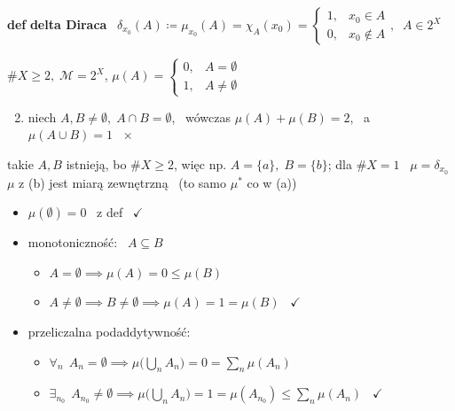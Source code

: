 \documentclass[a4paper,12pt]{article}
\begin{document}
\begin{podpunkty}
    \smallskip
    \textbf{def} \; \textbf{delta Diraca} \, \(\delta_{x_0}(A) \coloneqq \mu_{x_0}(A) = \chi_A(x_0) = \begin{cases} 1, & x_0 \in A \\ 0, & x_0 \notin A \end{cases}, \;\; A \in 2^X\)
    \item \(\#X \geq 2, \; \mathcal{M} = 2^X\), \; \(\mu(A) = \begin{cases} 0, & A = \emptyset \\ 1, & A \neq \emptyset \end{cases}\)
    \begin{enumerate}[label=\roman*), leftmargin=1.9em, itemsep=0.2em, topsep=0.2em, parsep=0pt, partopsep=0pt]
        \setcounter{enumi}{1}
        \item niech \(A, B \neq \emptyset, \; A \cap B = \emptyset\), \, wówczas \(\mu(A) + \mu(B) = 2\), \, a \(\mu(A \cup B) = 1\) \, \(\times\)
    \end{enumerate}
    takie \(A, B\) istnieją, bo \(\#X \geq 2\), więc np. \(A = \{a\}, \; B = \{b\}\); \; dla \(\#X = 1\) \, \(\mu = \delta_{x_0}\)
    \itemzdc \(\mu\) z (b) jest miarą zewnętrzną \, (to samo \(\mu^*\) co w (a))
    \begin{itemize}
        \item \(\mu(\emptyset) = 0\) \, z def \, \(\checkmark\)
        \item monotoniczność: \, \(A \subseteq B\)
        \begin{itemize}
            \item \(A = \emptyset \implies \mu(A) = 0 \leq \mu(B)\)
            \item \(A \neq \emptyset \implies B \neq \emptyset \implies \mu(A) = 1 = \mu(B)\) \, \(\checkmark\)
        \end{itemize}
        \item przeliczalna podaddytywność:
        \begin{itemize}
            \item \(\forall_n \;\, A_n = \emptyset \implies \mu\big(\bigcup_n A_n\big) = 0 = \sum_n \mu(A_n)\)
            \item \(\exists_{n_0} \;\, A_{n_0} \neq \emptyset \implies \mu\big(\bigcup_n A_n\big) = 1 = \mu(A_{n_0}) \leq \sum_n \mu(A_n)\) \, \(\checkmark\)
        \end{itemize}
    \end{itemize}
\end{podpunkty}
\end{document}
